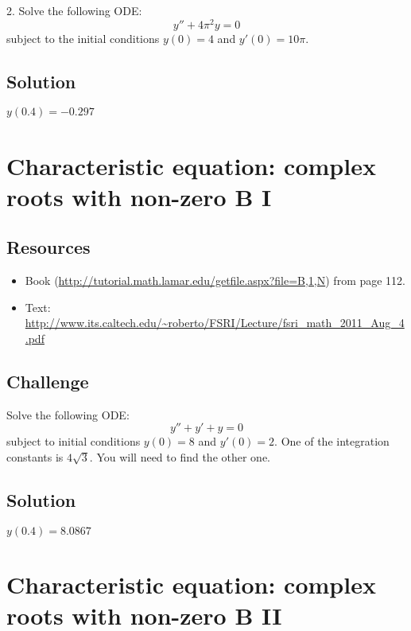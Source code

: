 2. Solve the following ODE:
\begin{equation}
    \label{eq:cecr}
    y'' + 4 \pi^2 y = 0
\end{equation}
subject to the initial conditions $y(0)=4$ and $y'(0)=10 \pi$.

\subsection*{Solution}
$y(0.4)=-0.297$




\newpage
\section{Characteristic equation: complex roots with non-zero B I}

\subsection*{Resources}
\begin{itemize}
    \item Book (\url{http://tutorial.math.lamar.edu/getfile.aspx?file=B,1,N}) from page 112.
    \item Text: \url{http://www.its.caltech.edu/~roberto/FSRI/Lecture/fsri_math_2011_Aug_4.pdf}
\end{itemize}

\subsection*{Challenge}
Solve the following ODE:
\begin{equation}
    y'' + y' + y = 0
\end{equation}
subject to initial conditions $y(0)=8$ and $y'(0)=2$. One of the integration constants is $4 \sqrt{3}$. You will need to find the other one.

\subsection*{Solution}
$y(0.4)=8.0867$




\newpage
\section{Characteristic equation: complex roots with non-zero B II}

